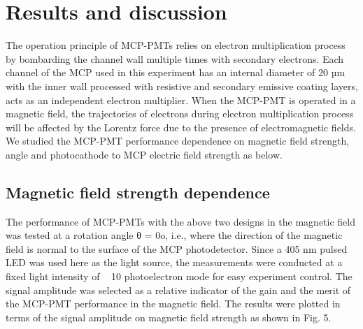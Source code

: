 \documentclass[preprint,5p]{elsarticle}
\begin{document}
\section{Results and discussion} \label{}
The operation principle of MCP-PMTs relies on electron multiplication process 
by bombarding the channel wall multiple times with secondary electrons. Each 
channel of the MCP used in this experiment has an internal diameter of 20 µm 
with the inner wall processed with resistive and secondary emissive coating 
layers, acts as an independent electron multiplier. When the MCP-PMT is 
operated in a magnetic field, the trajectories of electrons during electron 
multiplication process will be affected by the Lorentz force due to the 
presence of electromagnetic fields. We studied the MCP-PMT performance 
dependence on magnetic field strength, angle and photocathode to MCP electric 
field strength as below. 

\subsection{Magnetic field strength dependence} \label{}
The performance of MCP-PMTs with the above two designs in the magnetic field 
was tested at a rotation angle θ = 0o, i.e., where the direction of the 
magnetic field is normal to the surface of the MCP photodetector. Since a 405 
nm pulsed LED was used here as the light source, the measurements were 
conducted at a fixed light intensity of ~ 10 photoelectron mode for easy 
experiment control. The signal amplitude was selected as a relative indicator 
of the gain and the merit of the MCP-PMT performance in the magnetic field.  
The results were plotted in terms of the signal amplitude on magnetic field 
strength as shown in Fig. 5. 
\end{document}
